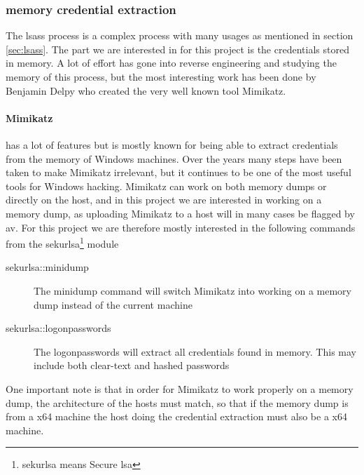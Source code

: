 \documentclass{article}
\begin{document}
\subsubsection{ memory credential extraction}
The \gls{lsass} process is a complex process with many usages as mentioned in section \ref{sec:lsass}. The part we are interested in for this project is the credentials stored in memory. A lot of effort has gone into reverse engineering and studying the memory of this process, but the most interesting work has been done by Benjamin Delpy who created the very well known tool Mimikatz\cite{url:lsass:mimikatz}.
\label{sec:mimikatz}
\paragraph{Mimikatz} has a lot of features but is mostly known for being able to extract credentials from the memory of Windows machines. Over the years many steps have been taken to make Mimikatz irrelevant, but it continues to be one of the most useful tools for Windows hacking. Mimikatz can work on both memory dumps or directly on the host, and in this project we are interested in working on a memory dump, as uploading Mimikatz to a host will in many cases be flagged by \gls{av}. For this project we are therefore mostly interested in the following commands from the sekurlsa\footnote{sekurlsa means Secure \gls{lsa}} module\cite{url:lsass:mimikatz:sekurlsa}

\begin{description}
    \item[sekurlsa::minidump] The minidump command will switch Mimikatz into working on a memory dump instead of the current machine
    \item[sekurlsa::logonpasswords] The logonpasswords will extract all credentials found in memory. This may include both clear-text and hashed passwords
\end{description}

One important note is that in order for Mimikatz to work properly on a memory dump, the architecture of the hosts must match, so that if the memory dump is from a x64 machine the host doing the credential extraction must also be a x64 machine.
\end{document}

